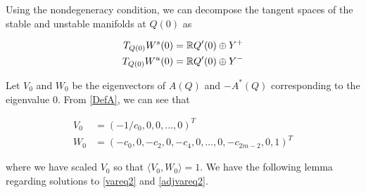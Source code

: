 \documentclass[thesis.tex]{subfiles}
\begin{document}
Using the nondegeneracy condition, we can decompose the tangent spaces of the stable and unstable manifolds at $Q(0)$ as

\begin{align*}
T_{Q(0)}W^s(0) &= {\mathbb R} Q'(0) \oplus Y^+ \\
T_{Q(0)}W^u(0) &= {\mathbb R} Q'(0) \oplus Y^- \\
\end{align*}

Let $V_0$ and $W_0$ be the eigenvectors of $A(Q)$ and $-A^*(Q)$ corresponding to the eigenvalue 0. From \eqref{DefA}, we can see that

\begin{align}
V_0 &= (-1/c_0, 0, 0, \dots, 0)^T \label{V0} \\
W_0 &= (-c_0, 0, -c_2, 0, -c_4, 0, \dots, 0, -c_{2m-2}, 0, 1)^T \label{W0}
\end{align}

where we have scaled $V_0$ so that $\langle V_0, W_0 \rangle = 1$. We have the following lemma regarding solutions to \eqref{vareq2} and \eqref{adjvareq2}.
\end{document}
